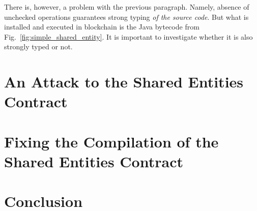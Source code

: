 \documentclass{llncs}
\begin{document}
There is, however, a problem with the previous paragraph. Namely, absence of unchecked
operations guarantees strong typing \emph{of the source code}. But what is installed
and executed in blockchain is the Java bytecode from Fig.~\ref{fig:simple_shared_entity}.
It is important to investigate whether it is also strongly typed or not.

\section{An Attack to the Shared Entities Contract}\label{sec:attack}

\section{Fixing the Compilation of the Shared Entities Contract} \label{sec:fix}

\section{Conclusion}\label{sec:conclusion} 



\end{document}
